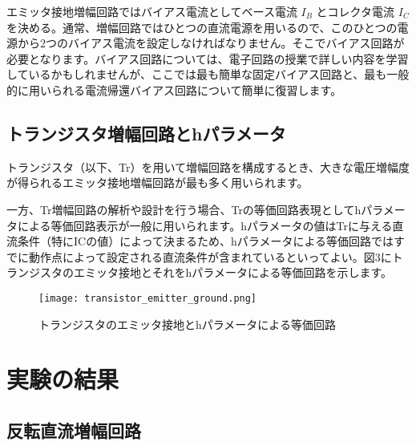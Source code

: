\documentclass[a4paper,11pt,xelatex,ja=standard]{bxjsarticle}
\begin{document}
    エミッタ接地増幅回路ではバイアス電流としてベース電流 $I_B$ とコレクタ電流 $I_C$ を決める。通常、増幅回路ではひとつの直流電源を用いるので、このひとつの電源から2つのバイアス電流を設定しなければなりません。そこでバイアス回路が必要となります。バイアス回路については、電子回路の授業で詳しい内容を学習しているかもしれませんが、ここでは最も簡単な固定バイアス回路と、最も一般的に用いられる電流帰還バイアス回路について簡単に復習します。

    \subsection{トランジスタ増幅回路とhパラメータ}

    トランジスタ（以下、Tr）を用いて増幅回路を構成するとき、大きな電圧増幅度が得られるエミッタ接地増幅回路が最も多く用いられます。

    一方、Tr増幅回路の解析や設計を行う場合、Trの等価回路表現としてhパラメータによる等価回路表示が一般に用いられます。hパラメータの値はTrに与える直流条件（特にICの値）によって決まるため、hパラメータによる等価回路ではすでに動作点によって設定される直流条件が含まれているといってよい。図3にトランジスタのエミッタ接地とそれをhパラメータによる等価回路を示します。

    \begin{figure}[H]
    \centering
    \texttt{[image: transistor\_emitter\_ground.png]}
    \caption{トランジスタのエミッタ接地とhパラメータによる等価回路}
    \end{figure}

\section{実験の結果}
    \subsection{反転直流増幅回路}
\end{document}
